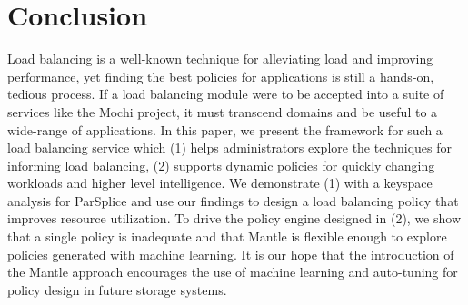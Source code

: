 \section{Conclusion}

Load balancing is a well-known technique for alleviating load and improving
performance, yet finding the best policies for applications is still a
hands-on, tedious process. If a load balancing module were to be accepted into
a suite of services like the Mochi project, it must transcend domains and be
useful to a wide-range of applications. In this paper, we present the framework
for such a load balancing service which (1) helps administrators explore the
techniques for informing load balancing, (2) supports dynamic policies for
quickly changing workloads and higher level intelligence.  We demonstrate (1)
with a keyspace analysis for ParSplice and use our findings to design a load
balancing policy that improves resource utilization.  To drive the policy
engine designed in (2), we show that a single policy is inadequate and that
Mantle is flexible enough to explore policies generated with machine learning.
It is our hope that the introduction of the Mantle approach encourages the use
of machine learning and auto-tuning for policy design in future storage
systems.
